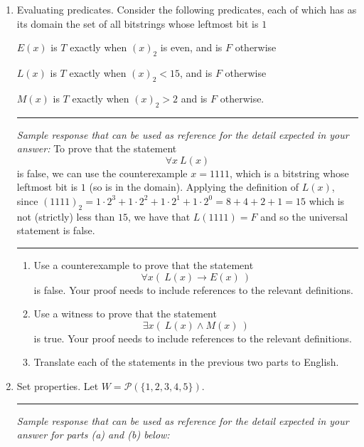 \documentclass[12pt, oneside]{article}
\begin{document}
\begin{enumerate}[labelindent=0pt, leftmargin=0pt]
    \vfill
    \newpage 
    \item  Evaluating predicates. Consider the following predicates, each of which has 
    as its domain the set of all bitstrings whose leftmost bit is $1$
    
    $E(x)$ is $T$ exactly when $(x)_{2}$ is even, and is $F$ otherwise
    
    $L(x)$ is $T$ exactly when $(x)_2 < 15$, and is $F$ otherwise
    
    $M(x)$ is $T$ exactly when $(x)_2 > 2$ and is $F$ otherwise.
    
    
    \rule{0.5\textwidth}{.4pt}
    
    {\it Sample response that can be used as reference for the detail expected 
    in your answer:} To prove that the statement $$\forall x ~L(x)$$ is false, we can use 
    the counterexample $x = 1111$, which is a bitstring whose leftmost bit is $1$ (so is in the domain).
    Applying the definition of $L(x)$, since $(1111)_2 = 1 \cdot 2^3 + 1\cdot 2^2 + 1 \cdot 2^1 + 1 \cdot 2^0 = 8 + 4+2+1 = 15$
    which is not (strictly) less than $15$, we have that $L(1111) = F$ and so the universal statement is false.
    
    
    \rule{0.5\textwidth}{.4pt}
    

    \begin{enumerate}
    \item Use a counterexample to prove that the statement
    \[
    \forall x ( ~L(x) \to E(x)~)
    \]
    is false.   Your proof needs to include references to the relevant definitions.

    
    \item Use a witness to prove that the statement
    \[
    \exists x (~L(x) \land M(x) ~)
    \]
    is true.  Your proof needs to include references to the relevant definitions.

    
    \item Translate each of the statements in the previous two
    parts to English.
    \end{enumerate}

        
    \vfill
    \newpage 
    \item Set properties. Let $W = \mathcal{P}(\{1,2,3,4,5\})$. 


    \rule{0.5\textwidth}{.4pt}
    
    {\it Sample response that can be used as reference for the detail expected 
    in your answer for parts (a) and (b) below:} 
    

\end{enumerate}
\end{document}
